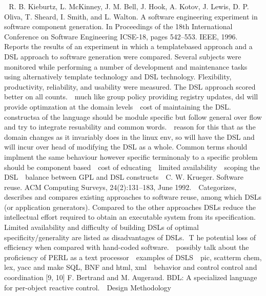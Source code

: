 \newline 
R. B. Kieburtz, L. McKinney, J. M. Bell, J. Hook,
A. Kotov, J. Lewis, D. P. Oliva, T. Sheard, I. Smith,
and L. Walton. A software engineering experiment in
software component generation. In Proceedings of the
18th International Conference on Software Engineering
ICSE-18, pages 542–553. IEEE, 1996.
Reports the results of an experiment in which a templatebased
approach and a DSL approach to software generation
were compared. Several subjects were monitored
while performing a number of development and maintenance
tasks using alternatively template technology and
DSL technology. Flexibility, productivity, reliability, and
usability were measured. The DSL approach scored better
on all counts.
\newline 
much like group policy providing registry updates, dsl will provide optimzation at the domain levels %
\newline 
cost of maintaining the DSL. constructsa of the language should be module specific but follow general over flow and try to integrate resuability and common words.
\newline 
reason for this that as the domain changes as it invariably does in the linux env, so will have the DSL and will incur over head of modifying the DSL as a whole.  Common terms should implment the same behaviour however specific terminonaly to a specific problem should be component based %
\newline 
cost of educating 
\newline 
limited availability
\newline 
scoping the DSL
\newline 
balance between GPL and DSL  constructs
\newline 
C. W. Krueger. Software reuse. ACM Computing Surveys,
24(2):131–183, June 1992.
\newline 
Categorizes, describes and compares existing approaches
to software reuse, among which DSLs (or
application generators). Compared to the other approaches
DSLs reduce the intellectual effort required to
obtain an executable system from its specification. Limited
availability and difficulty of building DSLs of optimal
specificity/generality are listed as disadvantages of
DSLs.
\newline T
he potential loss of efficiency when compared with
hand-coded software.
\newline 
possibly talk about the proficiency of PERL as a text processor
\newline 
examples of DSLS
\newline 
pic, scatterm chem, lex, yacc and make 
SQL, BNF and html, xml
\newline 
behavior and control
control and coordination [9, 10]
F. Bertrand and M. Augeraud. BDL: A specialized language
for per-object reactive control.
\newline 
Design Methodology


